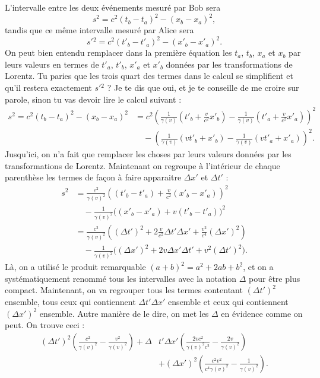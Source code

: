 L'intervalle entre les deux événements mesuré par Bob sera
\[
	s^2=c^2(t_b-t_a)^2-(x_b-x_a)^2,
\]
tandis que ce même intervalle mesuré par Alice sera
\[
	s'{}^2=c^2(t'_b-t'_a)^2-(x'_b-x'_a)^2.
\]
On peut bien entendu remplacer dans la première équation les \( t_a\), \( t_b\), \( x_a\) et \( x_b\) par leurs valeurs en termes de \( t'_a\), \( t'_b\), \( x'_a\) et \( x'_b\) données par les transformations de Lorentz. Tu paries que les trois quart des termes dans le calcul se simplifient et qu'il restera exactement \( s'{}^2\) ? Je te dis que oui, et je te conseille de me croire sur parole, sinon tu vas devoir lire le calcul suivant :
\begin{align*}
	s^2=c^2(t_b-t_a)^2-(x_b-x_a)^2 & =c^2\left(   \frac{1}{ \gamma(v) }(t'_b+\frac{ v }{ c^2 }x'_b)-\frac{1}{ \gamma(v) }(t'_a+\frac{ v }{ c^2 }x'_a)   \right)^2 \\
	                               & \quad-\left(  \frac{1}{ \gamma(v) }(vt'_b+x'_b)-\frac{1}{ \gamma(v) }(vt'_a+x'_a)  \right)^2.
\end{align*}
Jusqu'ici, on n'a fait que remplacer les choses par leurs valeurs données par les transformations de Lorentz. Maintenant on regroupe à l'intérieur de chaque parenthèse les termes de façon à faire apparaitre \( \Delta x'\) et \( \Delta t'\) :
\begin{align*}
	s^2 & =\frac{ c^2 }{ \gamma(v)^2 }\left( (t'_b-t'_a)+\frac{ v }{ c^2 }(x'_b-x'_a) \right)^2                                          \\
	    & \quad-\frac{1}{ \gamma(v)^2 }\big( (x'_b-x'_a)+v(t'_b-t'_a) \big)^2                                                            \\
	    & =\frac{ c^2 }{ \gamma(v)^2 }\left( (\Delta t')^2+2\frac{ v }{ c^2 }\Delta t'\Delta x'+\frac{ v^2 }{ c^4 }(\Delta x')^2 \right) \\
	    & \quad-\frac{1}{ \gamma(v)^2 }\Big( (\Delta x')^2+2v\Delta x'\Delta t'+v^2(\Delta t')^2 \Big).
\end{align*}
Là, on a utilisé le produit remarquable \( (a+b)^2=a^2+2ab+b^2\), et on a systématiquement renommé tous les intervalles avec la notation \( \Delta\) pour être plus compact. Maintenant, on va regrouper tous les termes contentant \( (\Delta t')^2\) ensemble, tous ceux qui contiennent \( \Delta t'\Delta x'\) ensemble et ceux qui contiennent \( (\Delta x')^2\) ensemble. Autre manière de le dire, on met les \( \Delta\) en évidence comme on peut. On trouve ceci :
\[
	\begin{split}
		(\Delta t')^2\left( \frac{ c^2 }{ \gamma(v)^2 }-\frac{ v^2 }{ \gamma(v)^2 } \right)+\Delta &t'\Delta x'\left( \frac{ 2vc^2 }{ \gamma(v)^2c^2 }-\frac{ 2v }{ \gamma(v)^2 } \right)\\
		&+(\Delta x')^2\left( \frac{ c^2 v^2 }{ c^4\gamma(v)^2 }-\frac{1}{ \gamma(v)^2 } \right).
	\end{split}
\]
